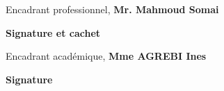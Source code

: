 \thispagestyle{empty}

\begin{center}
    \begin{minipage}[l]{1\columnwidth}
        \begin{tcolorbox}[colback=white,boxrule=5pt,arc=10pt,height=105mm]{
            \vspace{2cm}
            \large \@proSignSentence
            \vspace{1mm}
            \begin{center}
                \Large
                Encadrant professionnel, \textbf{Mr. Mahmoud Somai}
            \end{center}
            \vspace{5mm}
            \hspace{0.71\columnwidth}\textbf{\large Signature et cachet}
        }
        \end{tcolorbox}
    \end{minipage}
    
    \vspace{2cm}
    
    \begin{minipage}[l]{1\columnwidth}
        \begin{tcolorbox}[colback=white,boxrule=5pt,arc=10pt,height=105mm]{
            \vspace{2cm}
            \large \@academicSignSentence
            \vspace{1mm}
            \begin{center}
                \Large
                Encadrant académique, \textbf{Mme AGREBI Ines}
            \end{center}
            \vspace{5mm}
            \hspace{0.84\columnwidth}\textbf{\large Signature}
        }
        \end{tcolorbox}
    \end{minipage}
\end{center}